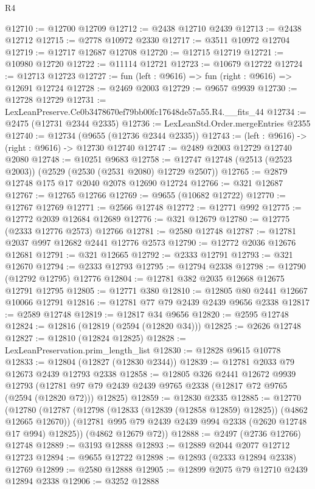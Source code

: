 \begin{lexlean}{R4}
\begin{coremodule}
@12710 := @12700 @12709
@12712 := @2438 @12710 @2439
@12713 := @2438 @12712
@12715 := @2778 @10972 @2330
@12717 := @3511 @10972 @12704
@12719 := @12717 @12687 @12708
@12720 := @12715 @12719
@12721 := @10980 @12720
@12722 := @11114 @12721
@12723 := @10679 @12722
@12724 := @12713 @12723
@12727 := fun (left : @9616) => fun (right : @9616) => @12691 @12724
@12728 := @2469 @2003
@12729 := @9657 @9939
@12730 := @12728 @12729
@12731 := LexLeanPreserve.Ce0b3478670ef79bb00fc17648de57a55.R4.__fits_44
@12734 := @2475 (@12731 @2344 @2335)
@12736 := LexLeanStd.Order.mergeEntries @2355
@12740 := @12734 (@9655 (@12736 @2344 @2335))
@12743 := (left : @9616) -> (right : @9616) -> @12730 @12740
@12747 := @2489 @2003 @12729 @12740 @2080
@12748 := @10251 @9683
@12758 := @12747 @12748 (@2513 (@2523 @2003)) (@2529 (@2530 (@2531 @2080) @12729 @2507))
@12765 := @2879 @12748 @175 @17 @2040 @2078 @12690 @12724
@12766 := @321 @12687
@12767 := @12765 @12766
@12769 := @9655 (@10682 @12722)
@12770 := @12767 @12769
@12771 := @2566 @12748
@12772 := @12771 @992
@12775 := @12772 @2039 @12684 @12689
@12776 := @321 @12679
@12780 := @12775 (@2333 @12776 @2573) @12766
@12781 := @2580 @12748
@12787 := @12781 @2037 @997 @12682 @2441 @12776 @2573
@12790 := @12772 @2036 @12676 @12681
@12791 := @321 @12665
@12792 := @2333 @12791
@12793 := @321 @12670
@12794 := @2333 @12793
@12795 := @12794 @2338
@12798 := @12790 (@12792 @12795) @12776
@12804 := @12781 @382 @2035 @12668 @12675 @12791 @12795
@12805 := @12771 @380
@12810 := @12805 @80 @2441 @12667 @10066 @12791
@12816 := @12781 @77 @79 @2439 @2439 @9656 @2338
@12817 := @2589 @12748
@12819 := @12817 @34 @9656
@12820 := @2595 @12748
@12824 := @12816 (@12819 (@2594 (@12820 @34)))
@12825 := @2626 @12748
@12827 := @12810 (@12824 @12825)
@12828 := LexLeanPreservation.prim_length_list
@12830 := @12828 @9615 @10778
@12833 := @12804 (@12827 (@12830 @2344))
@12839 := @12781 @2033 @79 @12673 @2439 @12793 @2338
@12858 := @12805
    @326
    @2441
    @12672
    @9939
    @12793
    (@12781 @97 @79 @2439 @2439 @9765 @2338 (@12817 @72 @9765 (@2594 (@12820 @72))) @12825)
@12859 := @12830 @2335
@12885 := @12770
    (@12780
      (@12787
        (@12798 (@12833 (@12839 (@12858 @12859) @12825)) (@4862 @12665 @12670))
        (@12781 @995 @79 @2439 @2439 @994 @2338 (@2620 @12748 @17 @994) @12825))
      (@4862 @12679 @72))
@12888 := @2497 (@2736 @12766) @12748
@12889 := @3193 @12888
@12893 := @12889 @2044 @2077 @12712 @12723
@12894 := @9655 @12722
@12898 := @12893 (@2333 @12894 @2338) @12769
@12899 := @2580 @12888
@12905 := @12899 @2075 @79 @12710 @2439 @12894 @2338
@12906 := @3252 @12888

\end{coremodule}
\end{lexlean}
